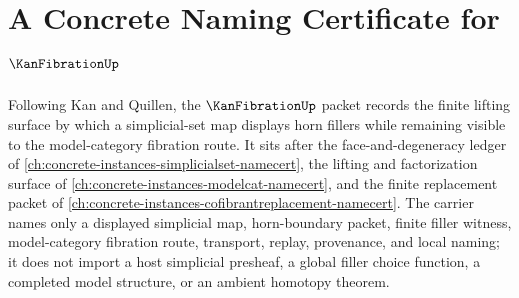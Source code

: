 \chapter{A Concrete Naming Certificate for $\KanFibrationUp$}
\label{ch:concrete-instances-kan-fibration-namecert}

Following Kan and Quillen, the $\KanFibrationUp$ packet records the finite lifting surface by which a simplicial-set map displays horn fillers while remaining visible to the model-category fibration route. It sits after the face-and-degeneracy ledger of \autoref{ch:concrete-instances-simplicialset-namecert}, the lifting and factorization surface of \autoref{ch:concrete-instances-modelcat-namecert}, and the finite replacement packet of \autoref{ch:concrete-instances-cofibrantreplacement-namecert}. The carrier names only a displayed simplicial map, horn-boundary packet, finite filler witness, model-category fibration route, transport, replay, provenance, and local naming; it does not import a host simplicial presheaf, a global filler choice function, a completed model structure, or an ambient homotopy theorem.

